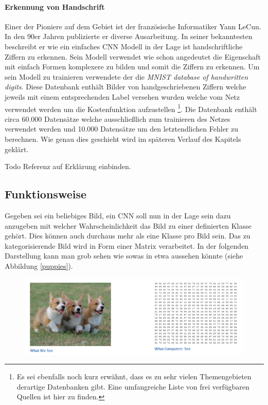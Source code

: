 \paragraph{Erkennung von Handschrift}
Einer der Pioniere auf dem Gebiet ist der französische Informatiker Yann LeCun. In den 90er Jahren publizierte er diverse Ausarbeitung. In seiner bekanntesten beschreibt er wie ein einfaches CNN Modell in der Lage ist handschriftliche Ziffern zu erkennen. Sein Modell verwendet wie schon angedeutet die Eigenschaft mit einfach Formen komplexere zu bilden und somit die Ziffern zu erkennen. Um sein Modell zu trainieren verwendete der die \emph{MNIST database of handwritten digits}. Diese Datenbank enthält Bilder von handgeschriebenen Ziffern welche jeweils mit einem entsprechenden Label versehen wurden welche vom Netz verwendet werden um die Kostenfunktion aufzustellen \footnote{Es sei ebenfalls noch kurz erwähnt, dass es zu sehr vielen Themengebieten derartige Datenbanken gibt. Eine umfangreiche Liste von frei verfügbaren Quellen ist hier \cite{openDataSets} zu finden.}. Die Datenbank enthält circa 60.000 Datensätze welche ausschließlich zum trainieren des Netzes verwendet werden und 10.000 Datensätze um den letztendlichen Fehler zu berechnen. Wie genau dies geschieht wird im späteren Verlauf des Kapitels geklärt. 

Todo Referenz auf Erklärung einbinden. 

\subsection{Funktionsweise}
Gegeben sei ein beliebiges Bild, ein CNN soll nun in der Lage sein dazu anzugeben mit welcher Wahrscheinlichkeit das Bild zu einer definierten Klasse gehört. Dies können auch durchaus mehr als eine Klasse pro Bild sein. Das zu kategorisierende Bild wird in Form einer Matrix verarbeitet. In der folgenden Darstellung kann man grob sehen wie sowas in etwa aussehen könnte (siehe Abbildung \ref{puppies}). 

\begin{figure}[!htb]
	\centering
	\includegraphics[width=.9\linewidth]{img/humanVsPc}
	\label{fig:puppies}
\end{figure}

